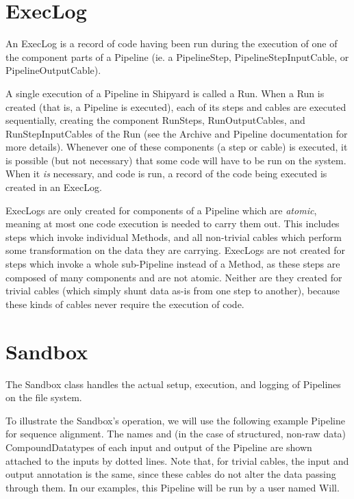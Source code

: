 \documentclass[12pt]{article}
\begin{document}
\section*{ExecLog}

An ExecLog is a record of code having been run during the execution of
one of the component parts of a Pipeline (ie. a PipelineStep,
PipelineStepInputCable, or PipelineOutputCable).

A single execution of a Pipeline in Shipyard is called a Run. When a Run
is created (that is, a Pipeline is executed), each of its steps and
cables are executed sequentially, creating the component RunSteps,
RunOutputCables, and RunStepInputCables of the Run (see the Archive and
Pipeline documentation for more details). Whenever one of these
components (a step or cable) is executed, it is possible (but not
necessary) that some code will have to be run on the system. When it
\emph{is} necessary, and code is run, a record of the code being
executed is created in an ExecLog. 

ExecLogs are only created for components of a Pipeline which are
\emph{atomic}, meaning at most one code execution is needed to carry
them out. This includes steps which invoke individual Methods, and all
non-trivial cables which perform some transformation on the data they
are carrying. ExecLogs are not created for steps which invoke a whole
sub-Pipeline instead of a Method, as these steps are composed of many
components and are not atomic. Neither are they created for trivial
cables (which simply shunt data as-is from one step to another), because
these kinds of cables never require the execution of code.

\section*{Sandbox}

The Sandbox class handles the actual setup, execution, and logging of Pipelines
on the file system. 

To illustrate the Sandbox's operation, we will use the following example
Pipeline for sequence alignment. The names and (in the case of structured,
non-raw data) CompoundDatatypes of each input and output of the Pipeline are
shown attached to the inputs by dotted lines. Note that, for trivial cables,
the input and output annotation is the same, since these cables do not alter
the data passing through them. In our examples, this Pipeline will be run by a
user named Will.
\end{document}
